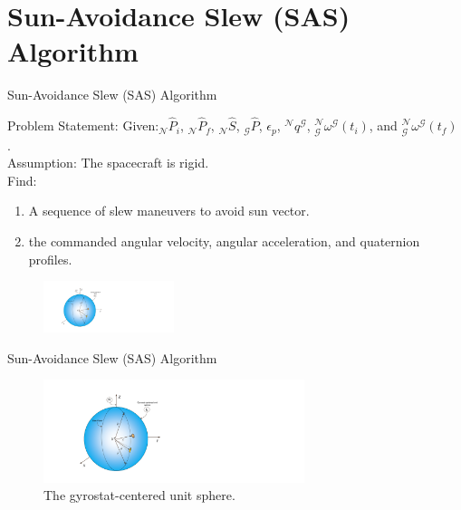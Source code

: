 \documentclass{beamer}
\begin{document}
\section{Sun-Avoidance Slew (SAS) Algorithm}

\begin{frame}{Sun-Avoidance Slew (SAS) Algorithm}
	\begin{block}{Problem Statement:}
		Given:$_\mathcal{N}\hat{P}_i$, $_\mathcal{N}\hat{P}_f$, $_\mathcal{N}\hat{S}$, $_\mathcal{G}\hat{P}$, $\epsilon_p$, $^\mathcal{N}q^\mathcal{G}$, $^\mathcal{N}_\mathcal{G}\omega^\mathcal{G}(t_i)$, and $^\mathcal{N}_\mathcal{G}\omega^\mathcal{G}(t_f)$ .\\
		Assumption: The spacecraft is rigid.\\
		Find: 
		\begin{enumerate}
			\item A sequence of slew maneuvers to avoid sun vector.
			\item the commanded angular velocity, angular acceleration, and quaternion profiles.
		\end{enumerate} 
		\begin{figure}
			\includegraphics[width=1.5in]{./Figures/SASSchematic1}
		\end{figure}
	\end{block}
\end{frame}
\begin{frame}{Sun-Avoidance Slew (SAS) Algorithm}
	\begin{block}{}
	\begin{figure}
	\includegraphics[width=3in]{./Figures/SASSchematic1}
	\caption{The gyrostat-centered unit sphere.}
	\end{figure}
	\end{block}
\end{frame}
\end{document}
